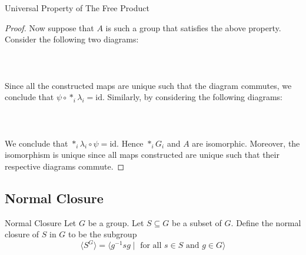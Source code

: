 \documentclass[a4paper]{article}
\begin{document}
\begin{prp}{Universal Property of The Free Product}{}
\begin{proof}
Now suppose that $A$ is such a group that satisfies the above property. Consider the following two diagrams: \\~\\
 \\~\\
Since all the constructed maps are unique such that the diagram commutes, we conclude that $\psi\circ\ast_i\lambda_i=\text{id}$. Similarly, by considering the following diagrams: \\~\\
 \\~\\
We conclude that $\ast_i\lambda_i\circ\psi=\text{id}$. Hence $\ast_iG_i$ and $A$ are isomorphic. Moreover, the isomorphism is unique since all maps constructed are unique such that their respective diagrams commute. 
\end{proof}
\end{prp}

\subsection{Normal Closure}
\begin{defn}{Normal Closure}{} Let $G$ be a group. Let $S\subseteq G$ be a subset of $G$. Define the normal closure of $S$ in $G$ to be the subgroup $$\langle S^G\rangle=\langle g^{-1}sg\;|\;\text{ for all }s\in S\text{ and }g\in G\rangle$$
\end{defn}
\end{document}
